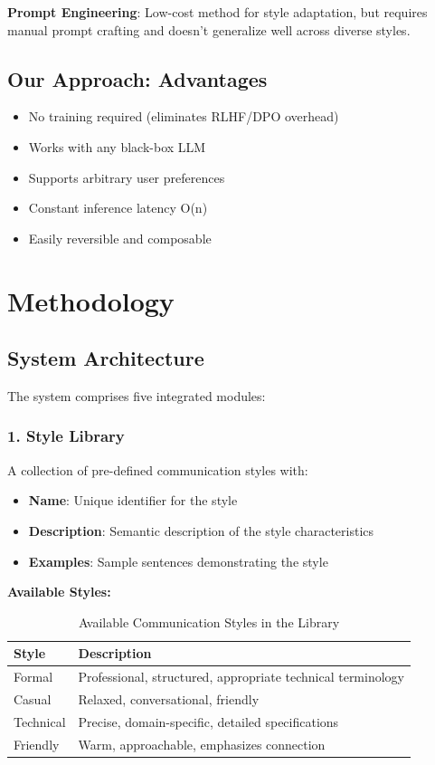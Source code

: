 \documentclass[11pt,a4paper]{article}
\begin{document}
\textbf{Prompt Engineering}: Low-cost method for style adaptation, but requires manual prompt crafting and doesn't generalize well across diverse styles.

\subsection{Our Approach: Advantages}

\begin{itemize}
    \item No training required (eliminates RLHF/DPO overhead)
    \item Works with any black-box LLM
    \item Supports arbitrary user preferences
    \item Constant inference latency O(n)
    \item Easily reversible and composable
\end{itemize}

\section{Methodology}

\subsection{System Architecture}

The system comprises five integrated modules:

\subsubsection{1. Style Library}

A collection of pre-defined communication styles with:
\begin{itemize}
    \item \textbf{Name}: Unique identifier for the style
    \item \textbf{Description}: Semantic description of the style characteristics
    \item \textbf{Examples}: Sample sentences demonstrating the style
\end{itemize}

\textbf{Available Styles:}

\begin{table}[H]
\centering
\begin{tabular}{|l|l|}
\toprule
\textbf{Style} & \textbf{Description} \\
\midrule
Formal & Professional, structured, appropriate technical terminology \\
Casual & Relaxed, conversational, friendly \\
Technical & Precise, domain-specific, detailed specifications \\
Friendly & Warm, approachable, emphasizes connection \\
\bottomrule
\end{tabular}
\caption{Available Communication Styles in the Library}
\end{table}
\end{document}
